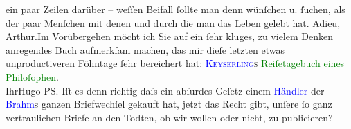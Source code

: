                ein paar Zeilen darüber – weſſen Beifall ſollte man denn wünſchen u. ſuchen, als der
               paar Menſchen mit {\pb}denen und durch
               die man das Leben gelebt hat.\pend
           \pstart
           Adieu, Arthur.\hspace*{1.5em}Im Vorübergehen möcht ich Sie auf ein
               ſehr kluges, zu vielem Denken anregendes Buch aufmerkſam machen, das mir dieſe
               letzten etwas unproductiveren Föhntage ſehr bereichert hat: \textsc{\textcolor{blue}{Keyserling}{}\ledrightnote{\textcolor{blue}{Hermann von Keyserling}}s}{ }\textcolor{green}{Reiſetagebuch eines
                  Philoſophen}{}\ledrightnote{\textcolor{green}{Das Reisetagebuch eines Philosophen}}.{\\}Ihr\spacefill\mbox{Hugo}\pend
           \pstart
           \noindent{}PS. Iſt es denn richtig daſs ein abſurdes Geſetz einem \textcolor{blue}{Händler}{} der \textcolor{blue}{Brahm}{}\ledrightnote{\textcolor{blue}{Otto Brahm}}s ganzen Briefwechſel gekauft hat, jetzt das Recht gibt, unſere ſo
                  ganz vertraulichen Briefe an den Todten, ob wir wollen oder nicht, zu publicieren?
               \pend
           \endnumbering{}  
      